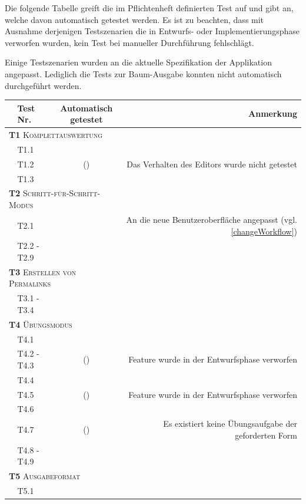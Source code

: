 \documentclass[parskip=full,11pt,openany]{scrreprt}
\newcommand{\cmark}{\ding{51}}%
\newcommand{\xmark}{\ding{55}}%
\begin{document}
Die folgende Tabelle greift die im Pflichtenheft definierten Test auf und gibt an,
welche davon automatisch getestet werden. 
Es ist zu beachten, dass mit Ausnahme derjenigen Testszenarien die in Entwurfs- oder
Implementierungsphase verworfen wurden, kein Test bei manueller Durchführung fehlschlägt.

Einige Testszenarien wurden an die aktuelle Spezifikation der Applikation angepasst. 
Lediglich die Tests zur Baum-Ausgabe konnten nicht automatisch durchgeführt werden. %

\begin{table}[h]
	\centering
	\begin{tabular}{@{}ll|c|r@{}}
		\toprule
		&\textbf{Test Nr.} & \makecell{\textbf{Automatisch}\\\textbf{getestet}} &\textbf{Anmerkung} \\ 
		\midrule
		\multicolumn{3}{l|}{\small \textsc{\textbf{T1} Komplettauswertung}} \\ 
		&T1.1 & \cmark & \\
		&T1.2 & (\cmark) & Das Verhalten des Editors wurde nicht getestet \\
		&T1.3 & \cmark & \\ 
		\multicolumn{3}{l|}{\small \textsc{\textbf{T2} Schritt-für-Schritt-Modus}}\\ 
		&T2.1 & \cmark & An die neue Benutzeroberfläche angepasst (vgl. \ref{changeWorkflow}) \\
		&T2.2 - T2.9 & \cmark & \\
		\multicolumn{3}{l|}{\small \textsc{\textbf{T3} Erstellen von Permalinks}}\\ 	
		&T3.1 - T3.4 & \cmark & \\
		\multicolumn{3}{l|}{\small \textsc{\textbf{T4} Übungsmodus}}\\ 
		&T4.1 & \cmark & \\
		&T4.2 - T4.3 & (\xmark) & Feature wurde in der Entwurfsphase verworfen \\
		&T4.4 & \cmark & \\
		&T4.5 & (\xmark) & Feature wurde in der Entwurfsphase verworfen \\
		&T4.6 & \cmark & \\
		&T4.7 & (\xmark) & Es existiert keine Übungsaufgabe der geforderten Form \\
		&T4.8 - T4.9 & \cmark & \\
		\multicolumn{3}{l|}{\small \textsc{\textbf{T5} Ausgabeformat}}\\ 
		&T5.1 & \cmark & \\

\end{tabular}
\end{table}
\end{document}
